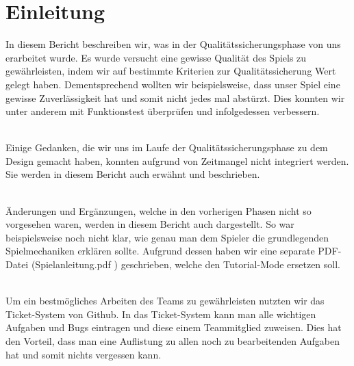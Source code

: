 %



\chapter{Einleitung}
\label{Kapitel:Einleitung}
In diesem Bericht beschreiben wir, was in der Qualitätssicherungsphase von uns erarbeitet wurde.
Es wurde versucht eine gewisse Qualität des Spiels zu gewährleisten, indem wir auf bestimmte Kriterien zur Qualitätssicherung Wert gelegt haben. Dementsprechend wollten wir beispielsweise, dass unser Spiel eine gewisse Zuverlässigkeit hat und somit nicht jedes mal abstürzt. Dies konnten wir unter anderem mit Funktionstest überprüfen und infolgedessen verbessern.\\~

Einige Gedanken, die wir uns im Laufe der Qualitätssicherungsphase zu dem Design gemacht haben, konnten aufgrund von Zeitmangel nicht integriert werden. Sie werden in diesem Bericht auch erwähnt und beschrieben.\\~

Änderungen und Ergänzungen, welche in den vorherigen Phasen nicht so vorgesehen waren, werden in diesem Bericht auch dargestellt. So war beispielsweise noch nicht klar, wie genau man dem Spieler die grundlegenden Spielmechaniken erklären sollte. Aufgrund dessen haben wir eine separate PDF-Datei (\glqq Spielanleitung.pdf \grqq) geschrieben, welche den Tutorial-Mode ersetzen soll.\\~

Um ein bestmögliches Arbeiten des Teams zu gewährleisten nutzten wir das Ticket-System von Github. In das Ticket-System kann man alle wichtigen Aufgaben und Bugs eintragen und diese einem Teammitglied zuweisen. Dies hat den Vorteil, dass man eine Auflistung zu allen noch zu bearbeitenden Aufgaben hat und somit nichts vergessen kann.
 











